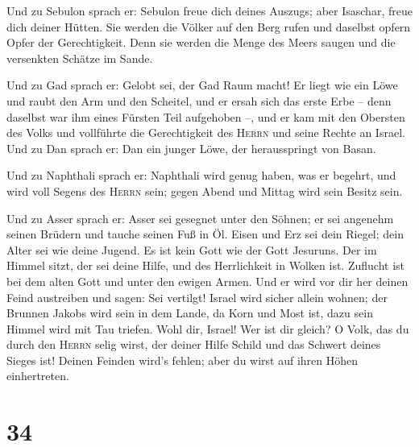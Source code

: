  Und zu Sebulon sprach er: Sebulon freue dich deines
Auszugs; aber Isaschar, freue dich deiner Hütten.  Sie
werden die Völker auf den Berg rufen und daselbst opfern Opfer der
Gerechtigkeit. Denn sie werden die Menge des Meers saugen und die
versenkten Schätze im Sande.

 Und zu Gad sprach er: Gelobt sei, der Gad Raum macht! Er
liegt wie ein Löwe und raubt den Arm und den Scheitel, 
und er ersah sich das erste Erbe -- denn daselbst war ihm eines Fürsten
Teil aufgehoben --, und er kam mit den Obersten des Volks und vollführte
die Gerechtigkeit des \textsc{Herrn} und seine Rechte an Israel.
 Und zu Dan sprach er: Dan ein junger Löwe, der
herausspringt von Basan.

 Und zu Naphthali sprach er: Naphthali wird genug haben,
was er begehrt, und wird voll Segens des \textsc{Herrn} sein; gegen
Abend und Mittag wird sein Besitz sein.

 Und zu Asser sprach er: Asser sei gesegnet unter den
Söhnen; er sei angenehm seinen Brüdern und tauche seinen Fuß in Öl.
 Eisen und Erz sei dein Riegel; dein Alter sei wie deine
Jugend.  Es ist kein Gott wie der Gott Jesuruns. Der im
Himmel sitzt, der sei deine Hilfe, und des Herrlichkeit in Wolken ist.
 Zuflucht ist bei dem alten Gott und unter den ewigen
Armen. Und er wird vor dir her deinen Feind austreiben und sagen: Sei
vertilgt!  Israel wird sicher allein wohnen; der Brunnen
Jakobs wird sein in dem Lande, da Korn und Most ist, dazu sein Himmel
wird mit Tau triefen.  Wohl dir, Israel! Wer ist dir
gleich? O Volk, das du durch den \textsc{Herrn} selig wirst, der deiner
Hilfe Schild und das Schwert deines Sieges ist! Deinen Feinden wird's
fehlen; aber du wirst auf ihren Höhen einhertreten.

\hypertarget{section-33}{%
\section{34}\label{section-33}}

